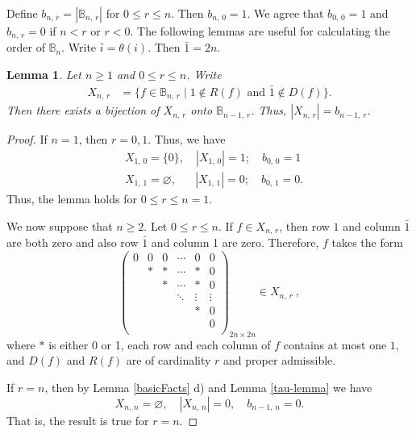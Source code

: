 \documentclass[11pt]{article}
\newtheorem{lemma}[theorem]{Lemma}
\newcommand{\q}{\quad}
\newcommand{\ges}{\geqslant}
\newcommand{\les}{\leqslant}
\begin{document}
Define $b_{n,\,r}=|\mathbb B_{n,\,r}|$ for $0\les r\les n$. Then $b_{n,\,0}=1$. We agree that $b_{0,\,0}=1$ and $b_{n,\,r}=0$ if $n<r$ or $r<0$.  
%
The following lemmas are useful for calculating the order of $\mathbb{B}_n.$ Write $\bar{i}=\theta(i)$. Then $\bar 1=2n.$ 
%
\begin{lemma}\label{lemma-Xnr1} Let $n\ges 1$ and  $0\les r\les n$. Write
\begin{align*}
    X_{n,\,r}&=\{f\in \mathbb B_{n,\,r}\mid 1\notin R(f)\text{ and } \bar{1}\notin D(f)\}.
\end{align*}
%
Then there exists a bijection of $X_{n,\,r}$ onto $\mathbb B_{n-1,\,r}$. Thus, $|X_{n,\,r}|=b_{n-1,\,r}$.
\end{lemma}
\begin{proof} 
If $n=1$, then $r=0, 1$. Thus, we have
 \begin{align*}
 &X_{1,\,0}=\{0\},\q |X_{1,\,0}|=1;\q b_{0,\,0}=1\\
 &X_{1,\,1}=\varnothing,\q~~~ |X_{1,\,1}|=0; \q b_{0,\,1}=0.
 \end{align*}
Thus, the lemma holds for $0\les r\les n=1.$

We now suppose that $n\ges 2$.  Let $0\les r\les n$. 
If $f\in X_{n,\,r}$, then row $1$ and column $\bar{1}$  are both zero and also row $\bar{1}$ and column 1 are zero. Therefore, $f$ takes the form
\[
\begin{pmatrix}
            0 & 0 & 0 &\cdots & 0& 0 \\
              & * & * &\cdots & *& 0  \\
              &   & * &\cdots & *& 0 \\
              &   &   &\ddots &\vdots&\vdots \\
              &   &   &       & *& 0  \\
              &   &   &       &  & 0  \\
             \end{pmatrix}_{2n \times 2n} \in X_{n,\,r}~,
\]
where $*$ is either 0 or 1, each row and each column of $f$ contains at most one $1$, and $D(f)$ and $R(f)$ are of cardinality $r$ and proper admissible. 

If $r=n$, then by Lemma \ref{basicFacts} d) and Lemma \ref{tau-lemma} we have 
\[
    X_{n,\,n}=\varnothing,\q |X_{n,\,n}|=0,\q b_{n-1,\,n}=0.
\]  
That is, the result is true for $r=n$.


\end{proof}
\end{document}
